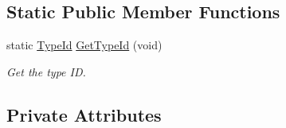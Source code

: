 \subsection*{Static Public Member Functions}
\begin{DoxyCompactItemize}
\item 
static \hyperlink{classns3_1_1TypeId}{Type\+Id} \hyperlink{classns3_1_1olsr_1_1MessageHeader_a3efc6beac25614a86bc77199f89e656a}{Get\+Type\+Id} (void)
\begin{DoxyCompactList}\small\item\em Get the type ID. \end{DoxyCompactList}\end{DoxyCompactItemize}
\subsection*{Private Attributes}
